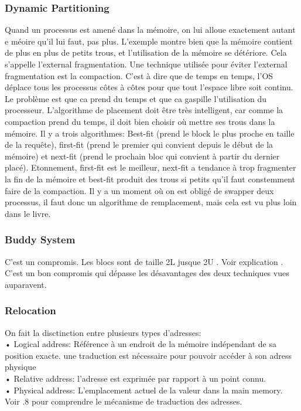 \subsubsection{Dynamic Partitioning}
Quand un processus est amené dans la mémoire, on lui alloue exactement autant e méoire qu'il lui faut, pas plus. L'exemple \cite[p.~314]{stallings} montre bien que la mémoire contient de plus en plus de petits trous, et l'utilisation de la mémoire se détériore. Cela s'appelle l'external fragmentation. Une technique utilisée pour éviter l'external fragmentation est la compaction. C'est à dire que de temps en temps, l'OS déplace tous les processus côtes à côtes pour que tout l'espace libre soit continu. Le problème est que ca prend du temps et que ca gaspille l'utilisation du processeur.
L'algorithme de placement doit être très intelligent, car comme la compaction prend du temps, il doit bien choisir où mettre ses trous dans la mémoire. Il y a trois algorithmes: Best-fit (prend le block le plus proche en taille de la requête), first-fit (prend le premier qui convient depuis le début de la mémoire) et next-fit (prend le prochain bloc qui convient à partir du dernier placé). Etonnement, first-fit est le meilleur, next-fit a tendance à trop fragmenter la fin de la mémoire et best-fit produit des trous si petits qu'il faut constemment faire de la compaction.
Il y a un moment où on est obligé de swapper deux processus, il faut donc un algorithme de remplacement, mais cela est vu plus loin dans le livre.
\subsubsection{Buddy System}
C'est un compromis. Les blocs sont de taille 2L jusque 2U . Voir explication \cite[p.~317]{stallings}. C'est un bon compromis qui dépasse les désavantages des deux techniques vues auparavent.
\subsubsection{Relocation}
On fait la disctinction entre plusieurs types d'adresses: \\
• Logical address: Référence à un endroit de la mémoire indépendant de sa position exacte. une traduction est nécessaire pour pouvoir accéder à son adress physique \\
• Relative address: l'adresse est exprimée par rapport à un point connu. \\
• Physical address: L'emplacement actuel de la valeur dans la main memory. Voir \cite[p.~7]{stallings}.8 pour comprendre le mécanisme de traduction des adresses.
